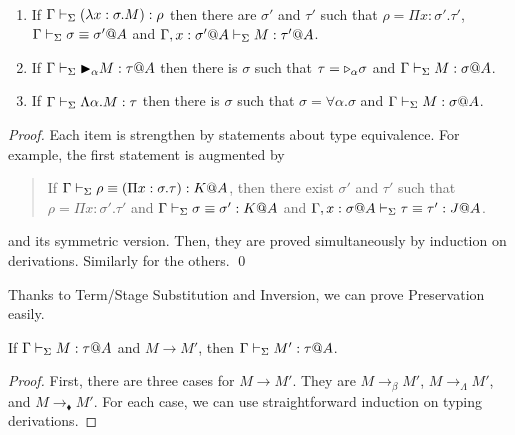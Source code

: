 \begin{lemma}[Inversion]\ 
	\begin{enumerate}
		\item If $\Gamma \vdash_\Sigma (\lambda x:\sigma.M) : \rho$ then there are $\sigma'$ and $\tau'$ such that
		      $\rho = \Pi x:\sigma'.\tau'$, $\Gamma \vdash_\Sigma \sigma \equiv \sigma'@A$ and $\Gamma ,x:\sigma'@A\vdash_\Sigma M:\tau'@A$.
		\item If $\G \V \TB_\alpha M : \tau@A$ then 
		      there is $\sigma$ such that $\tau = {\mathop{\triangleright}}_\alpha \sigma$ and $\G \V M : \sigma@A$.
		  \item If $\Gamma \vdash_\Sigma \Lambda\alpha.M : \tau$ then 
		  there is $\sigma$ such that $\sigma = \forall\alpha.\sigma$ and $\G \V M : \sigma@A$.%
	\end{enumerate}
\end{lemma}

\begin{proof}
  Each item is strengthen by statements about type equivalence.
  For example, the first statement is augmented by
  \begin{quotation}
    If $\Gamma \vdash_\Sigma \rho \equiv (\Pi x:\sigma.\tau) : K @A$, then there exist
    $\sigma'$ and $\tau'$ such that $\rho = \Pi x:\sigma'.\tau'$ and
    $\Gamma \vdash_\Sigma \sigma \equiv \sigma' : K @A$ and
    $\G, x:\sigma@A\V \tau \E \tau' : J @A$.
  \end{quotation}
  and its symmetric version.  Then, they are proved simultaneously by induction on derivations.
  Similarly for the others.
 \qed
\end{proof}



Thanks to Term/Stage Substitution and Inversion, we can prove Preservation easily.

\begin{theorem}[Preservation]
	If $\Gamma\vdash_\Sigma M:\tau @A$ and $M \longrightarrow M'$, then $\Gamma\vdash_\Sigma M':\tau @A$.
\end{theorem}

\begin{proof}
	First, there are three cases for $M \longrightarrow M'$.
	They are $M \longrightarrow_\beta M'$, $M \longrightarrow_\Lambda M'$, and $M \longrightarrow_\blacklozenge M'$.
	For each case, we can use straightforward induction on typing derivations.
\end{proof}


